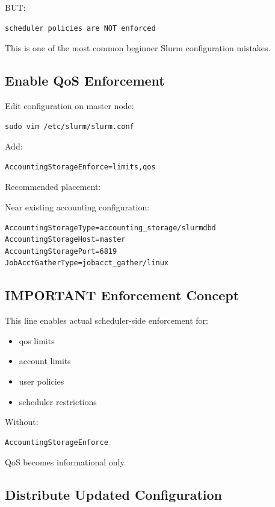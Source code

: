 \documentclass[11pt]{article}
\begin{document}
BUT:

\begin{verbatim}
scheduler policies are NOT enforced
\end{verbatim}

This is one of the most common beginner Slurm configuration mistakes.
\subsection{Enable QoS Enforcement}
\label{sec:org3215925}

Edit configuration on master node:

\begin{verbatim}
sudo vim /etc/slurm/slurm.conf
\end{verbatim}

Add:

\begin{verbatim}
AccountingStorageEnforce=limits,qos
\end{verbatim}

Recommended placement:

Near existing accounting configuration:

\begin{verbatim}
AccountingStorageType=accounting_storage/slurmdbd
AccountingStorageHost=master
AccountingStoragePort=6819
JobAcctGatherType=jobacct_gather/linux
\end{verbatim}
\subsection{IMPORTANT Enforcement Concept}
\label{sec:org2a82226}

This line enables actual scheduler-side enforcement for:

\begin{itemize}
\item qos limits
\item account limits
\item user policies
\item scheduler restrictions
\end{itemize}

Without:

\begin{verbatim}
AccountingStorageEnforce
\end{verbatim}

QoS becomes informational only.
\subsection{Distribute Updated Configuration}
\label{sec:orgdc2bfdc}
\end{document}
